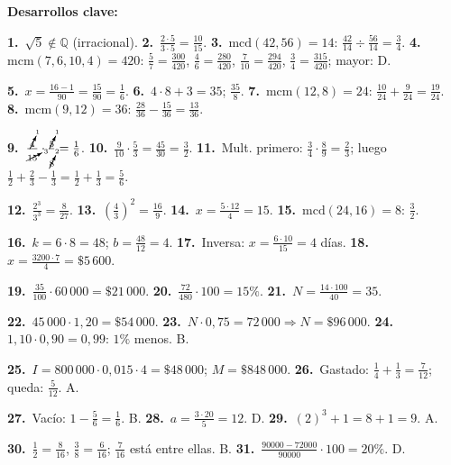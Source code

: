 \documentclass[11pt, letterpaper]{article}
\begin{document}
\medskip
\textbf{Desarrollos clave:}

\textbf{1.}~$\sqrt{5}\notin\mathbb{Q}$ (irracional). \quad
\textbf{2.}~$\tfrac{2\cdot5}{3\cdot5}=\tfrac{10}{15}$. \quad
\textbf{3.}~$\text{mcd}(42,56)=14$: $\tfrac{42}{14}\div\tfrac{56}{14}=\tfrac{3}{4}$. \quad
\textbf{4.}~$\text{mcm}(7,6,10,4)=420$: $\tfrac{5}{7}=\tfrac{300}{420}$, $\tfrac{4}{6}=\tfrac{280}{420}$, $\tfrac{7}{10}=\tfrac{294}{420}$, $\tfrac{3}{4}=\tfrac{315}{420}$; mayor: D.

\textbf{5.}~$x=\tfrac{16-1}{90}=\tfrac{15}{90}=\tfrac{1}{6}$. \quad
\textbf{6.}~$4\cdot8+3=35$; $\tfrac{35}{8}$. \quad
\textbf{7.}~$\text{mcm}(12,8)=24$: $\tfrac{10}{24}+\tfrac{9}{24}=\tfrac{19}{24}$. \quad
\textbf{8.}~$\text{mcm}(9,12)=36$: $\tfrac{28}{36}-\tfrac{15}{36}=\tfrac{13}{36}$.

\textbf{9.}~$\tfrac{\cancelto{1}{4}}{\cancelto{3}{15}}\cdot\tfrac{\cancelto{1}{5}}{\cancelto{2}{8}}=\tfrac{1}{6}$. \quad
\textbf{10.}~$\tfrac{9}{10}\cdot\tfrac{5}{3}=\tfrac{45}{30}=\tfrac{3}{2}$. \quad
\textbf{11.}~Mult. primero: $\tfrac{3}{4}\cdot\tfrac{8}{9}=\tfrac{2}{3}$; luego $\tfrac{1}{2}+\tfrac{2}{3}-\tfrac{1}{3}=\tfrac{1}{2}+\tfrac{1}{3}=\tfrac{5}{6}$.

\textbf{12.}~$\tfrac{2^3}{3^3}=\tfrac{8}{27}$. \quad
\textbf{13.}~$\left(\tfrac{4}{3}\right)^2=\tfrac{16}{9}$. \quad
\textbf{14.}~$x=\tfrac{5\cdot12}{4}=15$. \quad
\textbf{15.}~$\text{mcd}(24,16)=8$: $\tfrac{3}{2}$.

\textbf{16.}~$k=6\cdot8=48$; $b=\tfrac{48}{12}=4$. \quad
\textbf{17.}~Inversa: $x=\tfrac{6\cdot10}{15}=4$ d\'ias. \quad
\textbf{18.}~$x=\tfrac{3200\cdot7}{4}=\$5\,600$.

\textbf{19.}~$\tfrac{35}{100}\cdot60\,000=\$21\,000$. \quad
\textbf{20.}~$\tfrac{72}{480}\cdot100=15\%$. \quad
\textbf{21.}~$N=\tfrac{14\cdot100}{40}=35$.

\textbf{22.}~$45\,000\cdot1{,}20=\$54\,000$. \quad
\textbf{23.}~$N\cdot0{,}75=72\,000\Rightarrow N=\$96\,000$. \quad
\textbf{24.}~$1{,}10\cdot0{,}90=0{,}99$: $1\%$ menos. B.

\textbf{25.}~$I=800\,000\cdot0{,}015\cdot4=\$48\,000$; $M=\$848\,000$. \quad
\textbf{26.}~Gastado: $\tfrac{1}{4}+\tfrac{1}{3}=\tfrac{7}{12}$; queda: $\tfrac{5}{12}$. A.

\textbf{27.}~Vac\'io: $1-\tfrac{5}{6}=\tfrac{1}{6}$. B. \quad
\textbf{28.}~$a=\tfrac{3\cdot20}{5}=12$. D. \quad
\textbf{29.}~$(2)^3+1=8+1=9$. A.

\textbf{30.}~$\tfrac{1}{2}=\tfrac{8}{16}$, $\tfrac{3}{8}=\tfrac{6}{16}$; $\tfrac{7}{16}$ est\'a entre ellas. B. \quad
\textbf{31.}~$\tfrac{90000-72000}{90000}\cdot100=20\%$. D.
\end{document}
